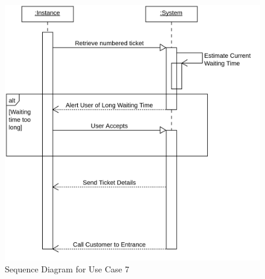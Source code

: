 \begin{figure}[H]
    \includegraphics[width=\textwidth]{Images/UML_Seq_Diag_7.png}
    \caption{\label{fig:Use_Case_Diag}Sequence Diagram for Use Case 7}
\end{figure}

